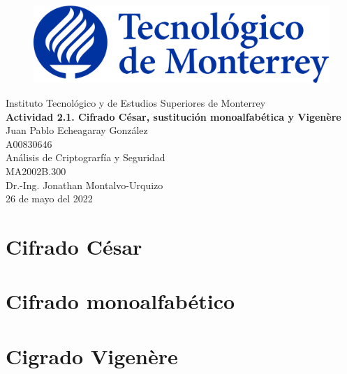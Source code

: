 \documentclass{article}
\begin{document}
    \begin{titlepage}
        \begin{center}
            \begin{figure}
                \centering
                \includegraphics[scale=0.13]{../../../logo_itesm.png}\\ %
            \end{figure}
        \vspace{5cm}
        \LARGE{Instituto Tecnológico y de Estudios Superiores de Monterrey}\\
        \fontsize{12}{14}\selectfont
        \vspace{1cm}
        \textbf{ Actividad 2.1. Cifrado César, sustitución monoalfabética y Vigenère}\\ %
        \vspace{0.7cm}
        Juan Pablo Echeagaray González\\ %
        \vspace{0.2cm}
        A00830646\\ %
        \vspace{0.7cm}
        Análisis de Criptograrfía y Seguridad\\ %
        \vspace{0.2cm}
        MA2002B.300\\ %
        \vspace{0.2cm}
        Dr.-Ing. Jonathan Montalvo-Urquizo\\ %
        \vspace{0.7cm}
        26 de mayo del 2022\\ %
        \end{center}
    \end{titlepage}

    \section{Cifrado César}

    \section{Cifrado monoalfabético}

    \section{Cigrado Vigenère}
\end{document}
